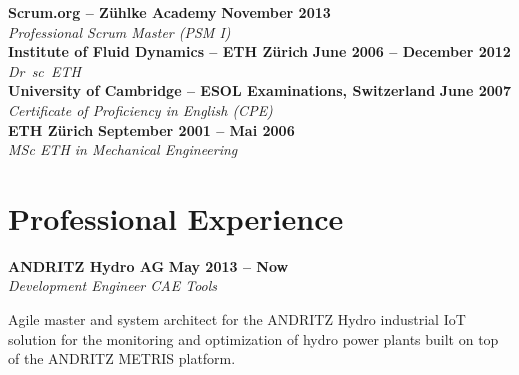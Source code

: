 \documentclass[line,11pt,a4paper]{../resume}
\begin{document}
\begin{resume}
\textbf{Scrum.org -- Z\"uhlke Academy} \hfill \textbf{November 2013}%
\vspace{2mm}\\\vspace{1mm}%
\textsl{Professional Scrum Master (PSM I)}%
\vspace{2mm}\\\vspace{-1mm}%
%
\textbf{Institute of Fluid Dynamics -- ETH Z\"urich} \hfill \textbf{June 2006 -- December 2012}%
\vspace{2mm}\\\vspace{1mm}%
\textsl{Dr\ sc\ ETH}%
\vspace{2mm}\\\vspace{-1mm}%
%
\textbf{University of Cambridge -- ESOL Examinations, Switzerland} \hfill \textbf{June 2007}%
\vspace{2mm}\\\vspace{1mm}%
\textsl{Certificate of Proficiency in English (CPE)}%
\vspace{2mm}\\\vspace{-1mm}%
%
\textbf{ETH Z\"urich} \hfill \textbf{September 2001 -- Mai 2006}%
\vspace{2mm}\\\vspace{1mm}%
\textsl{MSc ETH in Mechanical Engineering}%
\vspace{-3mm}\\\vspace{-1mm}%

\section{\mysidestyle Professional Experience}\vspace{2mm}

\textbf{ANDRITZ Hydro AG} \hfill \textbf{May 2013 -- Now}
\vspace{2mm}\\\vspace{1mm}%
\textsl{Development Engineer CAE Tools}\\
\begin{list2}
  \item Agile master and system architect for the ANDRITZ Hydro industrial IoT
    solution for the monitoring and optimization of hydro power plants built on
    top of the ANDRITZ METRIS platform.


\end{list2}
\end{resume}
\end{document}
